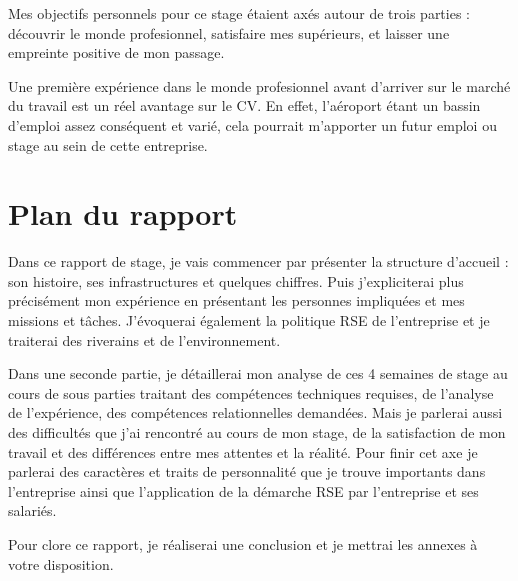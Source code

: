 Mes objectifs personnels pour ce stage étaient axés autour de trois parties : découvrir le monde profesionnel, satisfaire mes supérieurs, et laisser une empreinte positive de mon passage.


Une première expérience dans le monde profesionnel avant d’arriver sur le marché du travail est un réel avantage sur le CV. En effet, l’aéroport étant un bassin d’emploi assez conséquent et varié, cela pourrait m’apporter un futur emploi ou stage au sein de cette entreprise.



\section{Plan du rapport}

Dans ce rapport de stage, je vais commencer par présenter la structure d'accueil : son histoire, ses infrastructures et quelques chiffres. Puis j'expliciterai plus précisément mon expérience en présentant les personnes impliquées et mes missions et tâches. J'évoquerai également la politique RSE de l'entreprise et je traiterai des riverains et de l'environnement.

Dans une seconde partie, je détaillerai mon analyse de ces 4 semaines de stage au cours de sous parties traitant des compétences techniques requises, de l'analyse de l'expérience, des compétences relationnelles demandées. Mais je parlerai aussi des difficultés que j'ai rencontré au cours de mon stage, de la satisfaction de mon travail et des différences entre mes attentes et la réalité. Pour finir cet axe je parlerai des caractères et traits de personnalité que je trouve importants dans l'entreprise ainsi que l'application de la démarche RSE par l'entreprise et ses salariés.

Pour clore ce rapport, je réaliserai une conclusion et je mettrai les annexes à votre disposition.